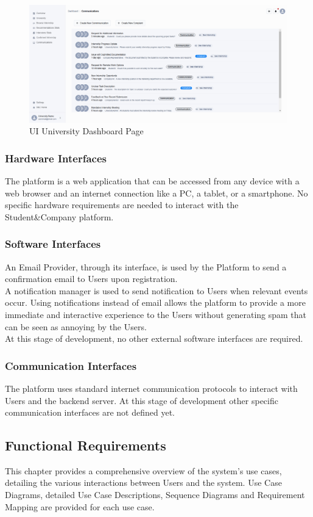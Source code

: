 \begin{figure}[H]
    \centering
    \includegraphics[width=\textwidth]{Latex/Images/New Ui/Uni-Dashboard.png}
    \caption{UI University Dashboard Page}
    \label{fig:universityDashboard}
\end{figure}

\subsubsection{Hardware Interfaces}
The platform is a web application that can be accessed from any device with a web browser and an internet connection like a PC, a tablet, or a smartphone. No specific hardware requirements are needed to interact with the Student\&Company platform.
\subsubsection{Software Interfaces}
\label{subsec:SWInteface}
An Email Provider, through its interface, is used by the Platform to send a confirmation email to Users upon registration. \\
A notification manager is used to send notification to Users when relevant events occur. Using notifications instead of email allows the platform to provide a more immediate and interactive experience to the Users without generating spam that can be seen as annoying by the Users.\\
At this stage of development, no other external software interfaces are required.
\subsubsection{Communication Interfaces}
The platform uses standard internet communication protocols to interact with Users and the backend server. At this stage of development other specific communication interfaces are not defined yet.

\subsection{Functional Requirements}
This chapter provides a comprehensive overview of the system's use cases, detailing the various interactions between Users and the system.
Use Case Diagrams, detailed Use Case Descriptions, Sequence Diagrams and Requirement Mapping are provided for each use case.
